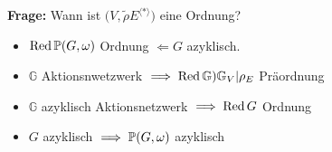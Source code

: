\textbf{Frage:} Wann ist $\big(V,\tilde{\rho}E^{\langle\ast\rangle}\big)$ eine Ordnung?
\begin{itemize}
	\item $\Red \P(G,\omega)$ Ordnung $\Longleftarrow G$ azyklisch.
	\item $\mathbb{G}$ Aktionsnwetzwerk $\implies \Red\mathbb{G})\mathbb{G}_V|\rho_E$ Präordnung
	\item $\mathbb{G}$ azyklisch Aktionsnetzwerk $\implies\Red G$ Ordnung
	\item $G$ azyklisch $\implies\P(G,\omega)$ azyklisch
\end{itemize}






